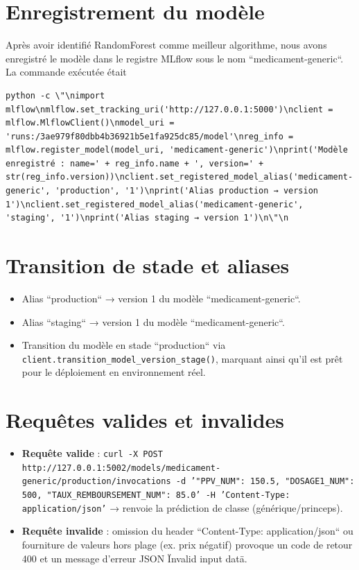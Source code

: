 \documentclass[12pt,a4paper]{report}
\begin{document}
\section{Enregistrement du modèle}
Après avoir identifié RandomForest comme meilleur algorithme, nous avons enregistré le modèle dans le registre MLflow sous le nom ``medicament-generic``. La commande exécutée était\begin{verbatim}
python -c \"\nimport mlflow\nmlflow.set_tracking_uri('http://127.0.0.1:5000')\nclient = mlflow.MlflowClient()\nmodel_uri = 'runs:/3ae979f80dbb4b36921b5e1fa925dc85/model'\nreg_info = mlflow.register_model(model_uri, 'medicament-generic')\nprint('Modèle enregistré : name=' + reg_info.name + ', version=' + str(reg_info.version))\nclient.set_registered_model_alias('medicament-generic', 'production', '1')\nprint('Alias production → version 1')\nclient.set_registered_model_alias('medicament-generic', 'staging', '1')\nprint('Alias staging → version 1')\n\"\n\end{verbatim}

\section{Transition de stade et aliases}
\begin{itemize}
    \item Alias ``production`` → version 1 du modèle ``medicament-generic``.
    \item Alias ``staging`` → version 1 du modèle ``medicament-generic``.
    \item Transition du modèle en stade ``production`` via \texttt{client.transition\_model\_version\_stage()}, marquant ainsi qu'il est prêt pour le déploiement en environnement réel.
\end{itemize}

\section{Requêtes valides et invalides}
\begin{itemize}
    \item \textbf{Requête valide} : \texttt{curl -X POST http://127.0.0.1:5002/models/medicament-generic/production/invocations -d '{"PPV_NUM": 150.5, "DOSAGE1_NUM": 500, "TAUX_REMBOURSEMENT_NUM": 85.0}' -H 'Content-Type: application/json'} → renvoie la prédiction de classe (générique/princeps).
    \item \textbf{Requête invalide} : omission du header ``Content-Type: application/json`` ou fourniture de valeurs hors plage (ex. prix négatif) provoque un code de retour 400 et un message d'erreur JSON {\ttfamily \"Invalid input data\"}.
\end{itemize}
\end{document}
